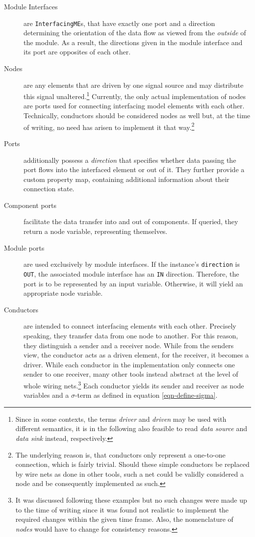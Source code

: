 \begin{description}
	\item[Module Interfaces] are \texttt{InterfacingME}s, that have exactly one port and a direction determining the orientation of the data flow as viewed from the \emph{outside} of the module.
	As a result, the directions given in the module interface and its port are opposites of each other.
	
	\item[Nodes] are any elements that are driven by one signal source and may distribute this signal unaltered.\footnote{
		Since in some contexts, the terms \emph{driver} and \emph{driven} may be used with different semantics, it is in the following also feasible to read \emph{data source} and \emph{data sink} instead, respectively.	
	}
	Currently, the only actual implementation of nodes are ports used for connecting interfacing model elements with each other.
	Technically, conductors should be considered nodes as well but, at the time of writing, no need has arisen to implement it that way.\footnote{
		The underlying reason is, that conductors only represent a one-to-one connection, which is fairly trivial.
		Should these simple conductors be replaced by wire nets as done in other tools, such a net could be validly considered a node and be consequently implemented as such.	
	}
	
	\item[Ports] additionally possess a \emph{direction} that specifies whether data passing the port flows into the interfaced element or out of it.
	They further provide a custom property map, containing additional information about their connection state.

	\item[Component ports] facilitate the data transfer into and out of components.
	If queried, they return a node variable, representing themselves.
	
	\item[Module ports] are used exclusively by module interfaces.
	If the instance's \texttt{direction} is \texttt{OUT}, the associated module interface has an \texttt{IN} direction.
	Therefore, the port is to be represented by an input variable.
	Otherwise, it will yield an appropriate node variable.
	
	\item[Conductors] are intended to connect interfacing elements with each other.
	Precisely speaking, they transfer data from one node to another.
	For this reason, they distinguish a sender and a receiver node.
	While from the senders view, the conductor acts as a driven element, for the receiver, it becomes a driver.
	While each conductor in the implementation only connects one sender to one receiver, many other tools instead abstract at the level of whole wiring nets.\footnote{
		It was discussed following these examples but no such changes were made up to the time of writing since it was found not realistic to implement the required changes within the given time frame. Also, the nomenclature of \emph{nodes} would have to change for consistency reasons.
	}
	Each conductor yields its sender and receiver as node variables and a $\sigma$-term as defined in equation \ref{eqn-define-sigma}.
\end{description}